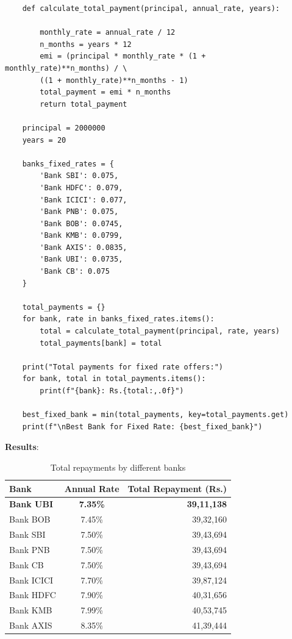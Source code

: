 \begin{itemize}
\begin{verbatim}
    def calculate_total_payment(principal, annual_rate, years):
    
        monthly_rate = annual_rate / 12
        n_months = years * 12
        emi = (principal * monthly_rate * (1 + monthly_rate)**n_months) / \
        ((1 + monthly_rate)**n_months - 1)
        total_payment = emi * n_months
        return total_payment
    
    principal = 2000000
    years = 20
    
    banks_fixed_rates = {
        'Bank SBI': 0.075,
        'Bank HDFC': 0.079,
        'Bank ICICI': 0.077,
        'Bank PNB': 0.075,
        'Bank BOB': 0.0745,
        'Bank KMB': 0.0799,
        'Bank AXIS': 0.0835,
        'Bank UBI': 0.0735,
        'Bank CB': 0.075
    }
    
    total_payments = {}
    for bank, rate in banks_fixed_rates.items():
        total = calculate_total_payment(principal, rate, years)
        total_payments[bank] = total
    
    print("Total payments for fixed rate offers:")
    for bank, total in total_payments.items():
        print(f"{bank}: Rs.{total:,.0f}")
    
    best_fixed_bank = min(total_payments, key=total_payments.get)
    print(f"\nBest Bank for Fixed Rate: {best_fixed_bank}")
\end{verbatim}

\textbf{Results}:

\begin{table}[h]
    \centering
    \begin{tabular}{l|cr}
        \toprule   
        \textbf{Bank} & \textbf{Annual Rate} & \textbf{Total Repayment (Rs.)} \\
        \midrule
        \textbf{Bank UBI} & \textbf{7.35\%} & \textbf{39,11,138} \\
        Bank BOB & 7.45\% & 39,32,160 \\
        Bank SBI & 7.50\% & 39,43,694 \\
        Bank PNB & 7.50\% & 39,43,694 \\
        Bank CB & 7.50\% & 39,43,694 \\
        Bank ICICI & 7.70\% & 39,87,124 \\
        Bank HDFC & 7.90\% & 40,31,656 \\
        Bank KMB & 7.99\% & 40,53,745 \\
        Bank AXIS & 8.35\% & 41,39,444 \\
        \bottomrule 
    \end{tabular}
    \caption{Total repayments by different banks}
    \label{tab:results-fixrate}
\end{table}


\end{itemize}
